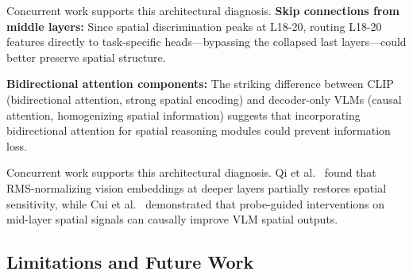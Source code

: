 \documentclass[10pt,twocolumn,letterpaper]{article}
\begin{document}
Concurrent work supports this architectural diagnosis. \textbf{Skip connections from middle layers:} Since spatial discrimination peaks at L18-20, routing L18-20 features directly to task-specific heads---bypassing the collapsed last layers---could better preserve spatial structure.

\textbf{Bidirectional attention components:} The striking difference between CLIP (bidirectional attention, strong spatial encoding) and decoder-only VLMs (causal attention, homogenizing spatial information) suggests that incorporating bidirectional attention for spatial reasoning modules could prevent information loss.

Concurrent work supports this architectural diagnosis. Qi et al.~\cite{Qi2025beyond} found that RMS-normalizing vision embeddings at deeper layers partially restores spatial sensitivity, while Cui et al.~\cite{Cui2025dual} demonstrated that probe-guided interventions on mid-layer spatial signals can causally improve VLM spatial outputs.

\subsection{Limitations and Future Work}
\end{document}
